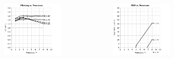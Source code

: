 \documentclass[handout,10pt]{beamer}
\begin{document}
\begin{frame}
\begin{columns}
\begin{figure}
	\end{figure}
\begin{minipage}[c][.6\textheight][c]{\linewidth}
	\vspace{-1em}
	\begin{figure}
	\centering
	\includegraphics[scale = 0.25]{ge_speed_2.png}
	\end{figure}
	\vspace{-2em}
	\begin{figure}
	\centering
	\includegraphics[scale = 0.25]{ge_speed_1.png}
	\end{figure}
\end{minipage}
\end{columns}
\end{frame}
\end{document}
